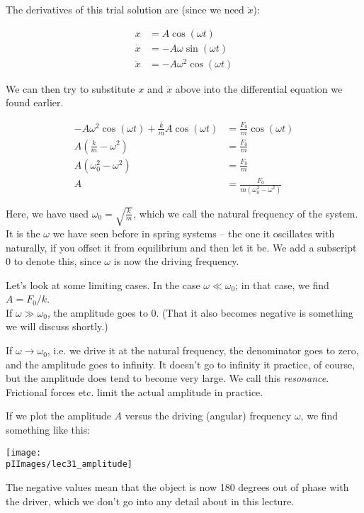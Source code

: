 The derivatives of this trial solution are (since we need $\ddot{x}$):

\begin{align}
x            &= A \cos (\omega t)\\
\dot{x}   &= -A \omega \sin(\omega t)\\
\ddot{x} &= -A \omega^2 \cos(\omega t)
\end{align}

We can then try to substitute $x$ and $\ddot{x}$ above into the differential equation we found earlier.

\begin{align}
-A \omega^2 \cos(\omega t) + \frac{k}{m} A \cos (\omega t) &=  \frac{F_0}{m} \cos (\omega t)\\
A\left(\frac{k}{m} - \omega^2\right)  &=  \frac{F_0}{m}\\
A\left(\omega_0^2 - \omega^2\right)  &=  \frac{F_0}{m}\\
A &=  \frac{F_0}{m\left(\omega_0^2 - \omega^2\right)}
\end{align}

Here, we have used $\displaystyle \omega_0 = \sqrt{\frac{k}{m}}$, which we call the natural frequency of the system. It is the $\omega$ we have seen before in spring systems -- the one it oscillates with naturally, if you offset it from equilibrium and then let it be. We add a subscript 0 to denote this, since $\omega$ is now the driving frequency.

Let's look at some limiting cases. In the case $\omega \ll \omega_0$; in that case, we find $A = F_0/k$.\\
If $\omega \gg \omega_0$, the amplitude goes to 0. (That it also becomes negative is something we will discuss shortly.)

If $\omega \to \omega_0$, i.e. we drive it at the natural frequency, the denominator goes to zero, and the amplitude goes to infinity. It doesn't go to infinity it practice, of course, but the amplitude does tend to become very large. We call this \emph{resonance}.\\
Frictional forces etc. limit the actual amplitude in practice.

If we plot the amplitude $A$ versus the driving (angular) frequency $\omega$, we find something like this:

\begin{center}
\texttt{[image: \\pIImages/lec31\_amplitude]}
\end{center}

The negative values mean that the object is now 180 degrees out of phase with the driver, which we don't go into any detail about in this lecture.

